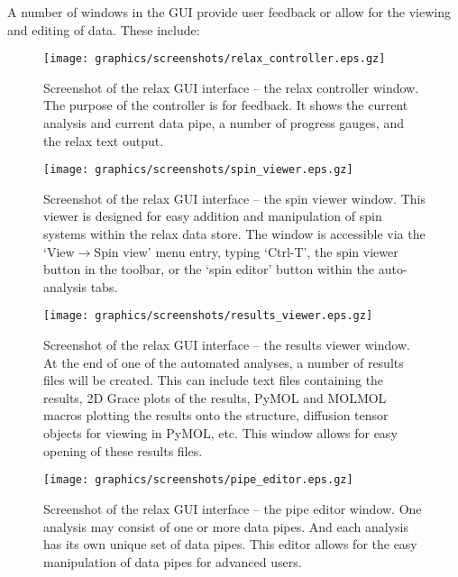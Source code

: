 A number of windows in the GUI provide user feedback or allow for the viewing and editing of data.  These include:

\begin{figure}
\centerline{\texttt{[image: graphics/screenshots/relax\_controller.eps.gz]}}
\caption[relax controller screenshot]{Screenshot of the relax GUI interface -- the relax controller window.  The purpose of the controller is for feedback.  It shows the current analysis and current data pipe, a number of progress gauges, and the relax text output.}\label{fig: screenshot: relax controller}
\end{figure}

\begin{figure}
\centerline{\texttt{[image: graphics/screenshots/spin\_viewer.eps.gz]}}
\caption[Spin viewer window screenshot]{Screenshot of the relax GUI interface -- the spin viewer window.  This viewer is designed for easy addition and manipulation of spin systems within the relax data store.  The window is accessible via the `View$\to$Spin view' menu entry, typing `Ctrl-T', the spin viewer button in the toolbar, or the `spin editor' button within the auto-analysis tabs.}\label{fig: screenshot: spin viewer}
\end{figure}

\begin{figure}
\centerline{\texttt{[image: graphics/screenshots/results\_viewer.eps.gz]}}
\caption[Results viewer window screenshot]{Screenshot of the relax GUI interface -- the results viewer window.  At the end of one of the automated analyses, a number of results files will be created.  This can include text files containing the results, 2D Grace plots of the results, PyMOL and MOLMOL macros plotting the results onto the structure, diffusion tensor objects for viewing in PyMOL, etc.  This window allows for easy opening of these results files.}\label{fig: screenshot: results viewer}
\end{figure}

\begin{figure}
\centerline{\texttt{[image: graphics/screenshots/pipe\_editor.eps.gz]}}
\caption[Pipe editor window screenshot]{Screenshot of the relax GUI interface -- the pipe editor window.  One analysis may consist of one or more data pipes.  And each analysis has its own unique set of data pipes.  This editor allows for the easy manipulation of data pipes for advanced users.}\label{fig: screenshot: pipe editor}
\end{figure}

